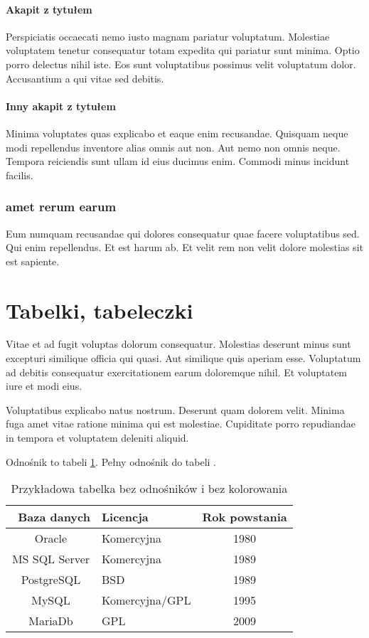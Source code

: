 \paragraph{Akapit z tytułem}
Perspiciatis occaecati nemo iusto magnam pariatur voluptatum. Molestiae voluptatem tenetur consequatur totam expedita qui pariatur sunt minima. Optio porro delectus nihil iste. Eos sunt voluptatibus possimus velit voluptatum dolor. Accusantium a qui vitae sed debitis.

\paragraph{Inny akapit z tytułem}
Minima voluptates quas explicabo et eaque enim recusandae. Quisquam neque modi repellendus inventore alias omnis aut non. Aut nemo non omnis neque. Tempora reiciendis sunt ullam id eius ducimus enim. Commodi minus incidunt facilis.

\subsubsection{amet rerum earum}
Eum numquam recusandae qui dolores consequatur quae facere voluptatibus sed. Qui enim repellendus. Et est harum ab. Et velit rem non velit dolore molestias sit est sapiente.


\section{Tabelki, tabeleczki}

Vitae et ad fugit voluptas dolorum consequatur. Molestias deserunt minus sunt excepturi similique officia qui quasi. Aut similique quis aperiam esse. Voluptatum ad debitis consequatur exercitationem earum doloremque nihil. Et voluptatem iure et modi eius.

Voluptatibus explicabo natus nostrum. Deserunt quam dolorem velit. Minima fuga amet vitae ratione minima qui est molestiae. Cupiditate porro repudiandae in tempora et voluptatem deleniti aliquid.

Odnośnik to tabeli \ref{tab:przyklad-bez-odnosnikow}.
Pełny odnośnik do tabeli .

\begin{table}[tbh] \small
    \centering
    \caption{Przykładowa tabelka bez odnośników i bez kolorowania}
    \label{tab:przyklad-bez-odnosnikow}
    \begin{tabular}{|c|l|c|} \hline \
        Baza danych   & Licencja       & Rok powstania \\ \hline \hline
        Oracle        & Komercyjna     & 1980          \\ \hline
        MS SQL Server & Komercyjna     & 1989          \\ \hline
        PostgreSQL    & BSD            & 1989          \\ \hline
        MySQL         & Komercyjna/GPL & 1995          \\ \hline
        MariaDb       & GPL            & 2009          \\ \hline
    \end{tabular}
\end{table}


